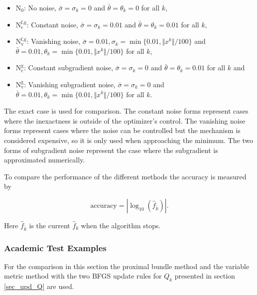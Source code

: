 \begin{itemize}[label={--}]
	\item \(\text{N}_0\): No noise, \(\bar{\sigma}=\sigma_k=0\) and \(\bar{\theta}=\theta_k=0\) for all \(k\),
	\item \(\text{N}_{\text{c}}^{\text{f,g}}\): Constant noise, \(\bar{\sigma}=\sigma_k=0.01\) and \(\bar{\theta}=\theta_k=0.01\) for all \(k\),
	\item \(\text{N}_{\text{v}}^{\text{f,g}}\): Vanishing noise, \(\bar{\sigma}=0.01, \sigma_k = \min\{0.01,\Vert x^k\Vert/100\}\) and \(\bar{\theta}=0.01, \theta_k=\min\{0.01,\Vert x^k\Vert/100\}\) for all \(k\),
	\item \(\text{N}_{\text{c}}^{\text{g}}\): Constant subgradient noise, \(\bar{\sigma}=\sigma_k=0\) and \(\bar{\theta}=\theta_k=0.01\) for all \(k\) and 
	\item \(\text{N}_{\text{v}}^{\text{g}}\): Vanishing subgradient noise, \(\bar{\sigma}=\sigma_k=0\) and \(\bar{\theta}=0.01, \theta_k=\min\{0.01,\Vert x^k\Vert/100\}\) for all \(k\).
\end{itemize}
The exact case is used for comparison. The constant noise forms represent cases where the inexactness is outside of the optimizer's control. The vanishing noise forms represent cases where the noise can be controlled  but the mechanism is considered expensive, so it is only used when approaching the minimum.
The two forms of subgradient noise represent the case where the subgradient is approximated numerically.


To compare the performance of the different methods the accuracy is measured by

\[ \text{accuracy} = |\log_{10}(\hat{f}_{\bar{k}})|. \]

Here \(\hat{f}_{\bar{k}}\) is the current \(\hat{f}_k\) when the algorithm stops.



\subsubsection{Academic Test Examples}

For the comparison in this section the proximal bundle method and the variable metric method with the two BFGS update rules for \(Q_k\) presented in section \ref{sec_upd_Q} are used. %

